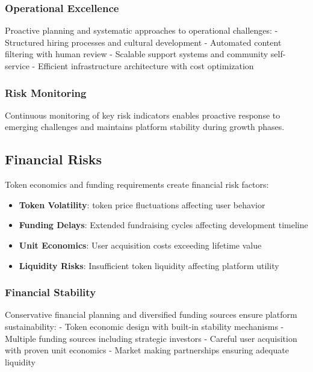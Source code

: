 \subsubsection{Operational Excellence}

Proactive planning and systematic approaches to operational challenges:
- Structured hiring processes and cultural development
- Automated content filtering with human review
- Scalable support systems and community self-service
- Efficient infrastructure architecture with cost optimization

\subsubsection{Risk Monitoring}

Continuous monitoring of key risk indicators enables proactive response to emerging challenges and maintains platform stability during growth phases.

\subsection{Financial Risks}

Token economics and funding requirements create financial risk factors:

\begin{itemize}
    \item \textbf{Token Volatility}: \tip{} token price fluctuations affecting user behavior
    \item \textbf{Funding Delays}: Extended fundraising cycles affecting development timeline
    \item \textbf{Unit Economics}: User acquisition costs exceeding lifetime value
    \item \textbf{Liquidity Risks}: Insufficient token liquidity affecting platform utility
\end{itemize}

\subsubsection{Financial Stability}

Conservative financial planning and diversified funding sources ensure platform sustainability:
- Token economic design with built-in stability mechanisms
- Multiple funding sources including strategic investors
- Careful user acquisition with proven unit economics
- Market making partnerships ensuring adequate liquidity